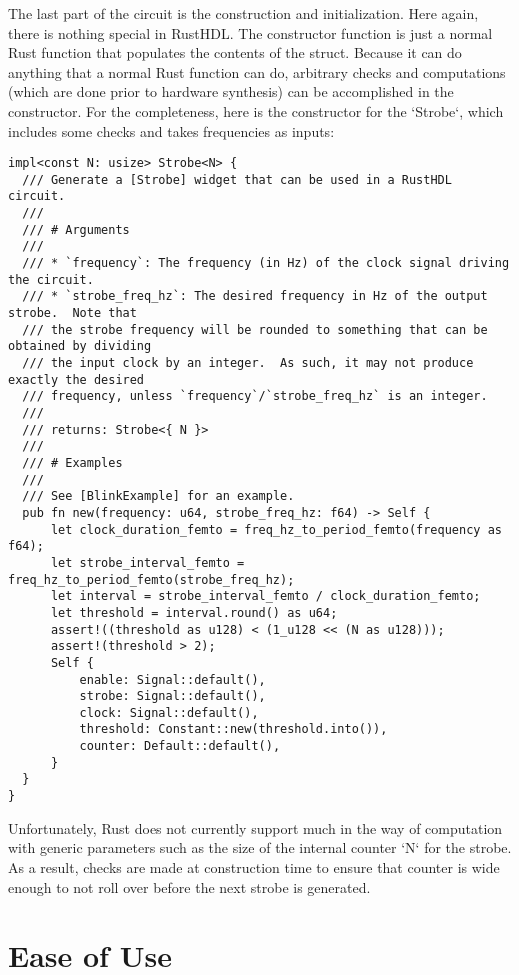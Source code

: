 \documentclass[conference]{IEEEtran}
\begin{document}
The last part of the circuit is the construction and initialization.  Here again, there is nothing special in RustHDL.  The 
constructor function is just a normal Rust function that populates the contents of the struct.  Because it can do anything
that a normal Rust function can do, arbitrary checks and computations (which are done prior to hardware synthesis) can be 
accomplished in the constructor.  For the completeness, here is the constructor for the `Strobe`, which includes some checks 
and takes frequencies as inputs:

\begin{verbatim}
impl<const N: usize> Strobe<N> {
  /// Generate a [Strobe] widget that can be used in a RustHDL circuit.
  ///
  /// # Arguments
  ///
  /// * `frequency`: The frequency (in Hz) of the clock signal driving the circuit.
  /// * `strobe_freq_hz`: The desired frequency in Hz of the output strobe.  Note that
  /// the strobe frequency will be rounded to something that can be obtained by dividing
  /// the input clock by an integer.  As such, it may not produce exactly the desired
  /// frequency, unless `frequency`/`strobe_freq_hz` is an integer.
  ///
  /// returns: Strobe<{ N }>
  ///
  /// # Examples
  ///
  /// See [BlinkExample] for an example.
  pub fn new(frequency: u64, strobe_freq_hz: f64) -> Self {
      let clock_duration_femto = freq_hz_to_period_femto(frequency as f64);
      let strobe_interval_femto = freq_hz_to_period_femto(strobe_freq_hz);
      let interval = strobe_interval_femto / clock_duration_femto;
      let threshold = interval.round() as u64;
      assert!((threshold as u128) < (1_u128 << (N as u128)));
      assert!(threshold > 2);
      Self {
          enable: Signal::default(),
          strobe: Signal::default(),
          clock: Signal::default(),
          threshold: Constant::new(threshold.into()),
          counter: Default::default(),
      }
  }
}
\end{verbatim}

Unfortunately, Rust does not currently support much in the way of computation with generic parameters such as the 
size of the internal counter `N` for the strobe.  As a result, checks are made at construction time to ensure that 
counter is wide enough to not roll over before the next strobe is generated.



\section{Ease of Use}
\end{document}
